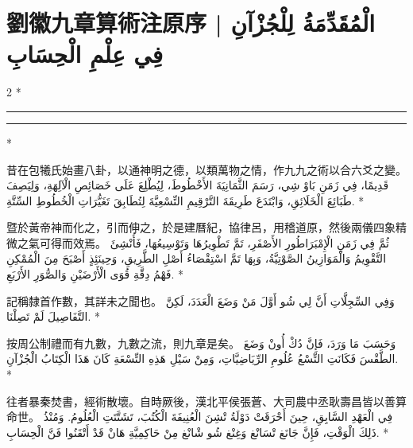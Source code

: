 \documentclass[11pt,a4paper]{article}
\newcommand{\ar}[1]{\arabicfont\beginR #1\endR}
\newenvironment{bilingual}{%
  \begin{paracol}{2}%
  \switchcolumn[0]*%
}{%
  \end{paracol}%
}
\newcommand{\cnline}[1]{\switchcolumn[0]\noindent #1 \switchcolumn[1]}
\newcommand{\arline}[1]{\noindent\ar{#1} \switchcolumn[0]*}
\newenvironment{prob bilingual}{%
  \begin{paracol}{2}%
  \switchcolumn[0]*%
}{%
  \end{paracol}%
  \vspace{0.3em}%
}
\begin{document}
\tableofcontents
\newpage


\section*{劉徽九章算術注原序 | \ar{الْمُقَدِّمَةُ لِلْجُزْآنِ فِي عِلْمِ الْحِسَابِ}}

\begin{bilingual}
\cnline{%
\begin{center}
\rule{0.4\columnwidth}{0.4pt}
\end{center}
}
\arline{%
\begin{center}
\rule{0.4\columnwidth}{0.4pt}
\end{center}
}

\cnline{%
昔在包犧氏始畫八卦，以通神明之德，以類萬物之情，作九九之術以合六爻之變。
}
\arline{%
قَدِيمًا، فِي زَمَنِ بَاوْ شِي، رَسَمَ الثَّمَانِيَةَ الأَخْطُوطَ، لِيُطْلِعَ عَلَى خَصَائِصِ الْآلِهَةِ، وَلِيَصِفَ طَبَائِعَ الْخَلَائِقِ، وَابْتَدَعَ طَرِيقَةَ التَّرْقِيمِ التِّسْعِيَّةَ لِتُطَابِقَ تَغَيُّرَاتِ الْخُطُوطِ السِّتَّةِ.
}

\cnline{%
暨於黃帝神而化之，引而伸之，於是建曆紀，協律呂，用稽道原，然後兩儀四象精微之氣可得而效焉。
}
\arline{%
ثُمَّ فِي زَمَنِ الْإِمْبَرَاطُورِ الأَصْفَرِ، تَمَّ تَطْوِيرُهَا وَتَوْسِيعُهَا، فَأُنْشِئَ التَّقْوِيمُ وَالْمَوَازِينُ الصَّوْتِيَّةُ، وَبِهَا تَمَّ اسْتِقْصَاءُ أَصْلِ الطَّرِيقِ، وَحِينَئِذٍ أَصْبَحَ مِنَ الْمُمْكِنِ فَهْمُ دِقَّةِ قُوَى الْأَرْضَيْنِ وَالصُّوَرِ الأَرْبَعِ.
}

\cnline{%
記稱隸首作數，其詳未之聞也。
}
\arline{%
وَفِي السِّجِلَّاتِ أَنَّ لِي شُو أَوَّلَ مَنْ وَضَعَ الْعَدَدَ، لَكِنَّ التَّفَاصِيلَ لَمْ تَصِلْنَا.
}

\cnline{%
按周公制禮而有九數，九數之流，則九章是矣。
}
\arline{%
وَحَسَبَ مَا وَرَدَ، فَإِنَّ دُكْ أُونْ وَضَعَ الطَّقْسَ فَكَانَتِ التِّسْعُ عُلُومِ الرِّيَاضِيَّاتِ، وَمِنْ سَيْلِ هَذِهِ التِّسْعَةِ كَانَ هَذَا الْكِتَابُ الْجُزْآنِ.
}

\cnline{%
往者暴秦焚書，經術散壞。自時厥後，漢北平侯張蒼、大司農中丞耿壽昌皆以善算命世。
}
\arline{%
فِي الْعَهْدِ السَّابِقِ، حِينَ أَحْرَقَتْ دَوْلَةُ تْشِنَ الْعُنِيفَةَ الْكُتُبَ، تَشَتَّتَتِ الْعُلُومُ. وَمُنْذُ ذَلِكَ الْوَقْتِ، فَإِنَّ جَانَغ تْسَانْغ وَغِنْغ شُو شْانْغ مِنْ حَاكِمِيَّةِ هَانْ قَدْ أَتْقَنُوا فَنَّ الْحِسَابِ.
}


\end{bilingual}
\end{document}
